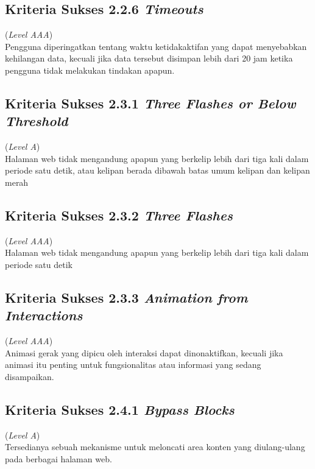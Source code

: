 \subsection{Kriteria Sukses 2.2.6 \textit{Timeouts}}
\label{subsec:kriteria_2.2.6}
(\textit{Level AAA}) \\

Pengguna diperingatkan tentang waktu ketidakaktifan yang dapat menyebabkan kehilangan data, kecuali jika data tersebut disimpan lebih dari 20 jam ketika pengguna tidak melakukan tindakan apapun.

\subsection{Kriteria Sukses 2.3.1 \textit{Three Flashes or Below Threshold}}
\label{subsec:kriteria_2.3.1}
(\textit{Level A}) \\

Halaman web tidak mengandung apapun yang berkelip lebih dari tiga kali dalam periode satu detik, atau kelipan berada dibawah batas umum kelipan dan kelipan merah

\subsection{Kriteria Sukses 2.3.2 \textit{Three Flashes}}
\label{subsec:kriteria_2.3.2}
(\textit{Level AAA}) \\

Halaman web tidak mengandung apapun yang berkelip lebih dari tiga kali dalam periode satu detik


\subsection{Kriteria Sukses 2.3.3 \textit{Animation from Interactions}}
\label{subsec:kriteria_2.3.3}
(\textit{Level AAA}) \\

Animasi gerak yang dipicu oleh interaksi dapat dinonaktifkan, kecuali jika animasi itu penting untuk fungsionalitas atau informasi yang sedang disampaikan.

\subsection{Kriteria Sukses 2.4.1 \textit{Bypass Blocks}}
\label{subsec:kriteria_2.4.1}
(\textit{Level A}) \\

Tersedianya sebuah mekanisme untuk meloncati area konten yang diulang-ulang pada berbagai halaman web.

